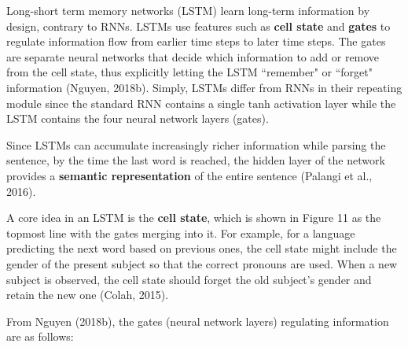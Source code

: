 Long-short term memory networks (LSTM) learn long-term information by design, contrary to RNNs. LSTMs use features such as \textbf{cell state} and \textbf{gates} to regulate information flow from earlier time steps to later time steps. The gates are separate neural networks that decide which information to add or remove from the cell state, thus explicitly letting the LSTM ``remember" or ``forget" information (Nguyen, 2018b). Simply, LSTMs differ from RNNs in their repeating module since the standard RNN contains a single $\text{tanh}$ activation layer while the LSTM contains the four neural network layers (gates). 

Since LSTMs can accumulate increasingly richer information while parsing the sentence, by the time the last word is reached, the hidden layer of the network provides a \textbf{semantic representation} of the entire sentence (Palangi et al., 2016). 

A core idea in an LSTM is the \textbf{cell state}, which is shown in Figure 11 as the topmost line with the gates merging into it. For example, for a language predicting the next word based on previous ones, the cell state might include the gender of the present subject so that the correct pronouns are used. When a new subject is observed, the cell state should forget the old subject's gender and retain the new one (Colah, 2015). 

From Nguyen (2018b), the gates (neural network layers) regulating information are as follows: 




